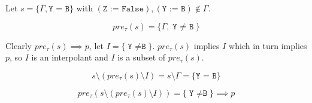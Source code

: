 \documentclass{article}
\begin{document}
Let $s = \{ \Gamma, \texttt{Y = B} \}$ with $(\texttt{Z := False}),
(\texttt{Y := B}) \not \in \Gamma$.

\[
pre_\tau(s) = \{ \Gamma, \texttt{Y $\neq$ B} \}
\]

Clearly $pre_\tau(s) \implies p$, let $I = \{\texttt{Y $\neq$
  B}\}$. $pre_\tau(s)$ implies $I$ which in turn implies $p$, so $I$
is an interpolant and $I$ is a subset of $pre_\tau(s)$.

\[
s \setminus (pre_\tau(s) \setminus I) = s \setminus \Gamma =
\{\texttt{Y = B}\}
\]

\[
pre_\tau(s \setminus (pre_\tau(s) \setminus I)) = \{\texttt{Y $\neq$
  B}\} \implies p
\]
\end{document}

